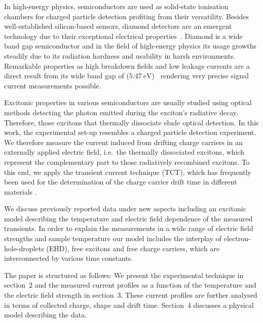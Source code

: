 
In high-energy physics, semiconductors are used as solid-state ionisation chambers for charged particle detection profiting from their versatility. 
Besides well-established silicon-based sensors, diamond detectors are an emergent technology due to their exceptional electrical properties~\cite{book:PhysApplCVD}. 
Diamond is a wide band gap semiconductor and in the field of high-energy physics its usage growths steadily due to its radiation hardness and usability in harsh environments. 
Remarkable properties as high breakdown fields and low leakage currents are a direct result from its wide band gap of ($\SI{5.47}{\eV}$)~\cite{1964} 
 rendering very precise signal current measurements possible. 

Excitonic properties in various semiconductors are usually studied using optical methods detecting the photon emitted during the exciton's radiative decay. 
Therefore, those excitons that thermally dissociate elude optical detection. 
In this work, the experimental set-up resembles a charged particle detection experiment. 
We therefore measure the current induced from drifting charge carriers in an externally applied electric field, i.e.\ the thermally dissociated excitons,
 which represent the complementary part to those radiatively recombined excitons. 
To this end, we apply the transient current technique (TCT), which has frequently been used for the determination of the charge carrier drift
 time in different materials \cite{TCT,Eremin1996388,pernegger:073704,PSSA:PSSA200561929,Fink2006227,PSSA:PSSA200561915}.

We discuss previously reported data \cite{jansen:173706} under new aspects including an excitonic model describing the temperature and electric field dependence of the measured transients. 
In order to explain the measurements in a wide range of electric field strengths and sample temperature our model includes the interplay of electron-hole-droplets (EHD), free excitons
 and free charge carriers, which are interconnected by various time constants. 
 
The paper is structured as follows:
We present the experimental technique in section~2 and the measured current profiles as a function of the temperature and the electric field strength in section~3. 
These current profiles are further analysed in terms of collected charge, shape and drift time. 
Section~4 discusses a physical model describing the data. 